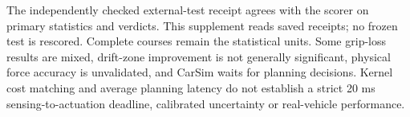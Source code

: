 \documentclass[11pt]{article}
\begin{document}
The independently checked external-test receipt agrees with the scorer on primary statistics and verdicts. This supplement reads saved receipts; no frozen test is rescored. Complete courses remain the statistical units. Some grip-loss results are mixed, drift-zone improvement is not generally significant, physical force accuracy is unvalidated, and CarSim waits for planning decisions. Kernel cost matching and average planning latency do not establish a strict 20 ms sensing-to-actuation deadline, calibrated uncertainty or real-vehicle performance.
\end{document}
